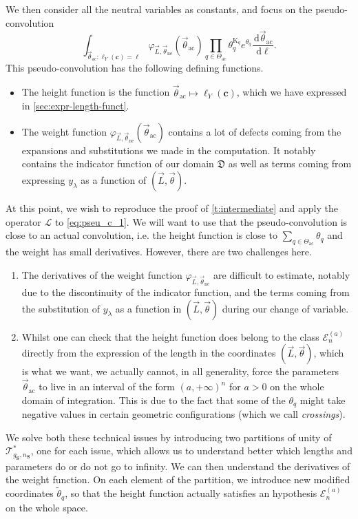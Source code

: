 \documentclass[12pt,twoside]{article}
\theoremstyle{theorem}
\theoremstyle{remark}
\theoremstyle{definition}
\theoremstyle{example}
\renewcommand{\d}{\, \mathrm{d}}
\newcommand{\1}[1]{\mathds{1}_{#1}}
\newcommand{\cT}{\mathcal{T}}
\newcommand{\cL}{\mathcal{L}}
\newcommand{\rK}{\mathrm{K}}
\newcommand{\cE}{\mathcal{E}}
\newcommand{\g}{g_{\mathbf{S}}}
\newcommand{\n}{n_{\mathbf{S}}}
\newcommand{\curve}{\mathbf{c}}
\newcommand{\thetaNe}{\vec{\theta}_{\mathrm{ne}}}
\newcommand{\thetaAc}{\vec{\theta}_{\mathrm{ac}}}
\begin{document}
We then consider all the neutral variables as constants, and focus on the pseudo-convolution 
\begin{equation}
  \label{eq:pseu_c_1}
  \int_{\thetaAc: \ell_Y(\curve)=\ell}
  \varphi_{\vec{L},\thetaNe}(\thetaAc) \prod_{q \in \Theta_{\mathrm{ac}}} \theta_q^{\rK_q} e^{\theta_q}
  \frac{\d \thetaAc}{\d \ell}.
\end{equation}
This pseudo-convolution has the following defining functions.
\begin{itemize}
\item The height function is the function $\thetaAc \mapsto \ell_Y(\curve)$, which we have expressed
  in \cref{sec:expr-length-funct}.
\item The weight function $\varphi_{\vec{L},\thetaNe}(\thetaAc)$ contains a lot of defects coming
  from the expansions and substitutions we made in the computation. It notably contains the
  indicator function of our domain $\mathfrak{D}$ as well as terms coming from expressing
  $y_\lambda$ as a function of $(\vec{L},\vec{\theta})$.
\end{itemize}
At this point, we wish to reproduce the proof of \cref{t:intermediate} and apply the operator $\cL$
to \eqref{eq:pseu_c_1}. We will want to use that the pseudo-convolution is close to an actual
convolution, i.e. the height function is close to $\sum_{q \in \Theta_{\mathrm{ac}}}\theta_q$ and the
  weight has small derivatives. However, there are two challenges here.
\begin{enumerate}
\item The derivatives of the weight function $\varphi_{\vec{L},\thetaNe}$ are difficult to estimate,
  notably due to the discontinuity of the indicator function, and the terms coming from the
  substitution of $y_\lambda$ as a function in $(\vec{L},\vec{\theta})$ during our change of
  variable.
\item Whilst one can check that the height function does belong to the class $\cE_n^{(a)}$ directly
  from the expression of the length in the coordinates $(\vec{L},\vec{\theta})$, which is what we
  want, we actually cannot, in all generality, force the parameters $\thetaAc$ to live in an
  interval of the form $(a,+\infty)^n$ for $a>0$ on the whole domain of integration. This is due to
  the fact that some of the $\theta_q$ might take negative values in certain geometric
  configurations (which we call \emph{crossings}).
\end{enumerate}
We solve both these technical issues by introducing two partitions of unity of $\cT_{\g,\n}^*$, one
for each issue, which allows us to understand better which lengths and parameters do or do not go to
infinity. We  can then understand the derivatives of the weight function.  On each element of
the partition, we introduce new modified coordinates $\tilde{\theta}_q$, so that the height function
actually satisfies an hypothesis $\cE_n^{(a)}$ on the whole space.
\end{document}
